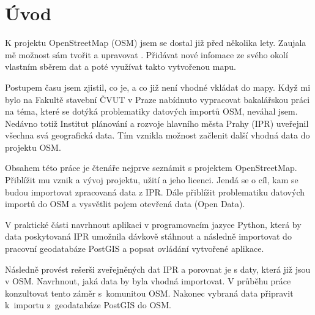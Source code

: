\chapter{Úvod}
\label{1-uvod}

K projektu OpenStreetMap (OSM) jsem se dostal již před několika lety.
Zaujala mě možnost sám tvořit a upravovat .
Přidávat nové infomace ze svého okolí vlastním sběrem dat
a poté využívat takto vytvořenou mapu.

Postupem času jsem zjistil, co je, a co již není vhodné vkládat do mapy.
Když mi bylo na Fakultě stavební ČVUT v Praze nabídnuto vypracovat
bakalářskou práci na téma, které se dotýká problematiky datových importů OSM,
neváhal jsem. Nedávno totiž Institut plánování a rozvoje hlavního města Prahy
(IPR) uveřejnil všechna svá geografická data.
Tím vznikla možnost začlenit další vhodná data do projektu OSM.

Obsahem této práce je čtenáře nejprve seznámit s projektem
OpenStreetMap. Přiblížit mu vznik a vývoj projektu, užití a jeho licenci.
Jendá se o cíl, kam se budou importovat zpracovaná data z IPR.
Dále přiblížit problematiku datových importů do OSM a vysvětlit
pojem otevřená data (Open Data).

V praktické části navrhnout aplikaci v programovacím jazyce Python,
která by data poskytovaná IPR umožnila dávkově stáhnout a následně
importovat do pracovní geodatabáze PostGIS a popsat ovládání
vytvořené aplikace.

Následně provést rešerši zveřejněných dat IPR a porovnat je s daty,
která již jsou v OSM. Navrhnout, jaká data by byla vhodná importovat.
V průběhu práce konzultovat tento záměr s~komunitou OSM.
Nakonec vybraná data připravit k~importu z~geodatabáze PostGIS
do OSM.
